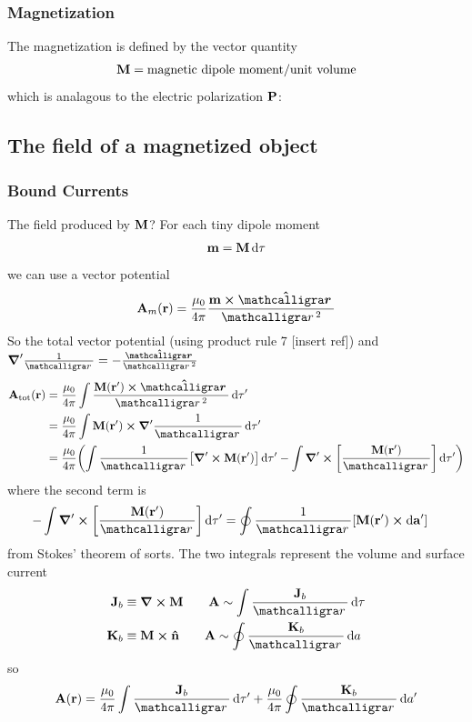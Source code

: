 \documentclass[../main.tex]{subfiles}
\begin{document}
\subsubsection{Magnetization}
The magnetization is defined by the vector quantity
\begin{align*}
    \vb M = \textrm{magnetic dipole moment/unit volume}
\end{align*}
which is analagous to the electric polarization $\vb P$: 
\subsection{The field of a magnetized object}
\subsubsection{Bound Currents}
The field produced by $\vb M$? For each tiny dipole moment
\begin{align*}
    \vb m = \vb M \dd{\tau} 
\end{align*}
we can use a vector potential
\begin{align*}
    \vb A_m (\vb r) = \frac{\mu_0}{4\pi} \frac{\vb m \cross \vu*\scriptr}{\scriptr^2}
\end{align*}
So the total vector potential (using product rule 7 [insert ref]) and $\grad'{\frac{1}{\scriptr}} = -\frac{\vu*\scriptr}{\scriptr^2}$
\begin{align*}
    \vb A_\text{tot} (\vb r) &= \frac{\mu_0}{4\pi} \int \frac{\vb M(\vb r') \cross \vu*\scriptr}{\scriptr^2} \dd{\tau'} \\
    &= \frac{\mu_0}{4\pi} \int \vb M(\vb r') \cross \grad'{\frac{1}{\scriptr}} \dd{\tau'} \\
    &= \frac{\mu_0}{4\pi} \qt(
        \int \frac{1}{\scriptr} \qt[
            \grad' \cross \vb M(\vb r') 
        ] \dd{\tau'} - \int \grad' \cross \qt[
            \frac{\vb M(\vb r')}{\scriptr}
        ] \dd{\tau'}
    )
\end{align*}
where the second term is
\begin{align*}
    - \int \grad' \cross \qt[
        \frac{\vb M(\vb r')}{\scriptr}
    ] \dd{\tau'} &= \oint \frac{1}{\scriptr} \qt[
        \vb M(\vb r') \cross \dd{\vb a'}
    ] 
\end{align*}
from Stokes' theorem of sorts. The two integrals represent the volume and surface current
\begin{align*}
    \vb J_b &\equiv \grad \cross \vb M \qquad \vb A \sim \int \frac{\vb J_b}{\scriptr} \dd{\tau} \\
    \vb K_b &\equiv \vb M \cross \vu n \qquad \vb A \sim \oint \frac{\vb K_b}{\scriptr} \dd{a}
\end{align*}
so
\begin{align*}
    \vb A(\vb r) = \frac{\mu_0}{4\pi} \int \frac{\vb J_b}{\scriptr} \dd{\tau'} + \frac{\mu_0}{4\pi} \oint \frac{\vb K_b}{\scriptr} \dd{a'}
\end{align*}
\end{document}
